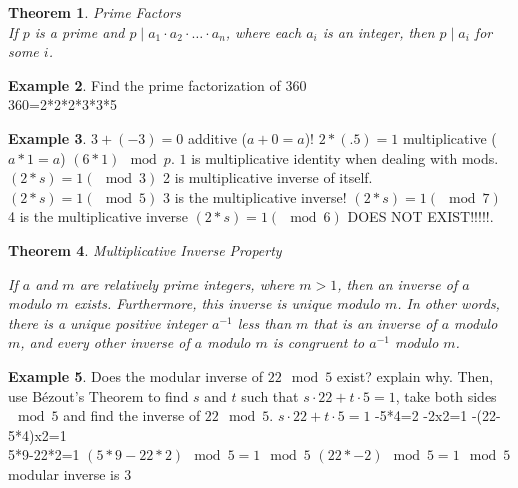 \documentclass[letterpaper,10pt]{article}
\theoremstyle{plain}
\newtheorem{thm}{Theorem}[section]
\theoremstyle{definition}
\newtheorem{exmp}[thm]{Example}
\theoremstyle{remark}
\begin{document}
\begin{thm}{Prime Factors}$ $\\
If $p$ is a prime and $p \mid a_1 \cdot a_2 \cdot \ldots \cdot a_n$, where each $a_i$ is an integer, then $p \mid a_i$ for some $i$.
\end{thm}
\begin{exmp}{Find the prime factorization of 360}
$ $\\
360=2*2*2*3*3*5
\end{exmp}

\begin{exmp}
$3+(-3)=0$ additive ($a+0=a$)!
\newline
$2*(.5)=1$ multiplicative ($a*1=a$)
\newline
$(6*1)\mod p$. $1$ is multiplicative identity when dealing with mods.
\newline
$(2*s)=1 (\mod 3)$ 2 is multiplicative inverse of itself.
\newline
$(2*s)=1 (\mod 5)$ 3 is the multiplicative inverse!
\newline
$(2*s)=1 (\mod 7)$ 4 is the multiplicative inverse
\newline
$(2*s)=1 (\mod 6)$ DOES NOT EXIST!!!!!.
\newline

\end{exmp}
\begin{thm}{Multiplicative Inverse Property}

If $a$ and $m$ are relatively prime integers, where $m > 1$, then an inverse of $a$ modulo $m$ exists. Furthermore, this inverse is unique modulo $m$. In other words, there is a unique positive integer $a^{-1}$ less than $m$ that is an inverse of $a$ modulo $m$, and every other inverse of $a$ modulo $m$ is congruent to $a^{-1}$ modulo $m$.

\end{thm}
\begin{exmp} Does the modular inverse of $22 \mod 5$ exist? explain why. Then, use Bézout's Theorem to find $s$ and $t$ such that $s\cdot 22+t\cdot 5=1$, take both sides $\mod 5$ and find the inverse of $22 \mod 5$.
\newline
$s\cdot22+t\cdot 5=1$
-5*4=2
-2x2=1
-(22-5*4)x2=1
\newline $ $\\
5*9-22*2=1
\newline
$(5*9-22*2)\mod 5=1\mod 5$
\newline
$(22*-2)\mod 5=1\mod 5$
\newline
modular inverse is $3$
\newline


\end{exmp}
\end{document}
